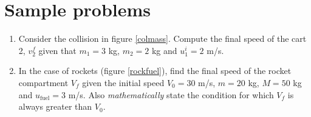 \documentclass[10pt]{article}
\begin{document}
\section{Sample problems}
\begin{enumerate}
\item Consider the collision in figure \ref{colmass}.  Compute the final speed of the cart 2, $v_2^f$ given that $m_1=3$ kg, $m_2=2$ kg and $u_1^i=2$ m/s.
\item In the case of rockets (figure \ref{rockfuel}), find the final speed of the rocket compartment $V_f$ given the initial speed $V_0=30$ m/s, $m=20$ kg, $M=50$ kg and $u_{\text{fuel}}=3$ m/s.  Also \emph{mathematically} state the condition for which $V_f$ is always greater than $V_0$. 
\end{enumerate}
\end{document}
